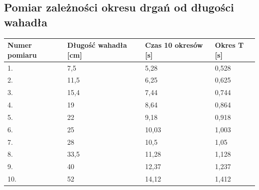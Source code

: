 \documentclass[a4paper,11pt]{article}
\begin{document}
\subsection{Pomiar zależności okresu drgań od długości wahadła}

\begin{table}[h]
\centering
\begin{tabular}{|l|l|l|l|}
\hline
Numer pomiaru & Długość wahadła {[}cm{]} &Czas 10 okresów {[}s{]} & Okres T {[}s{]} \\ \hline
1.            &7,5 & 5,28                    & 0,528                \\ \hline
2.            &11,5 & 6,25                    & 0,625                 \\ \hline
3.            &15,4 & 7,44                    & 0,744                 \\ \hline
4.            &19 & 8,64                    & 0,864                 \\ \hline
5.            &22 & 9,18                    & 0,918                 \\ \hline
6.            &25 & 10,03                    & 1,003                 \\ \hline
7.            &28 & 10,5                    & 1,05                 \\ \hline
8.            &33,5 & 11,28                    & 1,128                 \\ \hline
9.            &40 & 12,37                    & 1,237                 \\ \hline
10.           &52 & 14,12                    & 1,412                 \\ \hline
\end{tabular}
\end{table}
\end{document}

